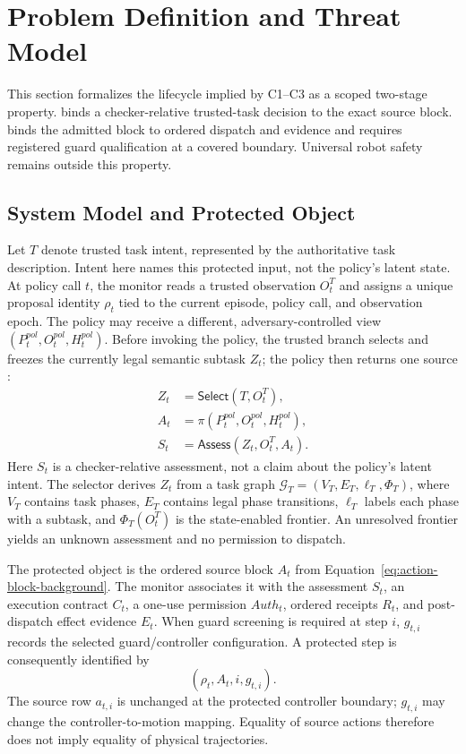 \section{Problem Definition and Threat Model}
\label{sec:model}

This section formalizes the lifecycle implied by C1--C3 as a scoped two-stage
property.  \lone binds a checker-relative trusted-task decision to the exact
source block.  \ltwo binds the admitted block to ordered dispatch and evidence
and requires registered guard qualification at a covered boundary.  Universal
robot safety remains outside this property.

\subsection{System Model and Protected Object}

Let $T$ denote trusted task intent, represented by the authoritative task
description.  Intent here names this protected input, not the policy's latent
state.  At policy call $t$, the monitor
reads a trusted observation $O^T_t$ and assigns a unique proposal identity
$\rho_t$ tied to the current episode, policy call, and observation epoch.  The
policy may receive a different, adversary-controlled view
$(P_t^{pol},O_t^{pol},H_t^{pol})$.  Before invoking the policy, the trusted branch
selects and freezes the currently legal semantic subtask $Z_t$; the policy then
returns one source \actionblock:
\begin{equation}
\begin{aligned}
Z_t &= \mathsf{Select}(T,O_t^T),\\
A_t &= \pi(P_t^{pol},O_t^{pol},H_t^{pol}),\\
S_t &= \mathsf{Assess}(Z_t,O_t^T,A_t).
\end{aligned}
\label{eq:proposal-generation}
\end{equation}
Here $S_t$ is a checker-relative assessment, not a claim about the policy's
latent intent.  The selector derives $Z_t$ from a task graph
$\mathcal G_T=(V_T,E_T,\ell_T,\Phi_T)$, where $V_T$ contains task phases,
$E_T$ contains legal phase transitions, $\ell_T$ labels each phase with a
subtask, and $\Phi_T(O_t^T)$ is the state-enabled frontier.  An unresolved
frontier yields an unknown assessment and no permission to dispatch.

The protected object is the ordered source block $A_t$ from
Equation~\ref{eq:action-block-background}.  The monitor associates it with the
assessment $S_t$, an execution contract $C_t$, a one-use permission
$\mathit{Auth}_t$, ordered receipts $R_t$, and post-dispatch effect evidence
$E_t$.  When guard screening is required at step $i$, $g_{t,i}$ records the
selected guard/controller configuration.  A protected step is consequently
identified by
\begin{equation}
(\rho_t,A_t,i,g_{t,i}).
\label{eq:protected-step}
\end{equation}
The source row $a_{t,i}$ is unchanged at the protected controller boundary;
$g_{t,i}$ may change the controller-to-motion mapping.  Equality of source
actions therefore does not imply equality of physical trajectories.

